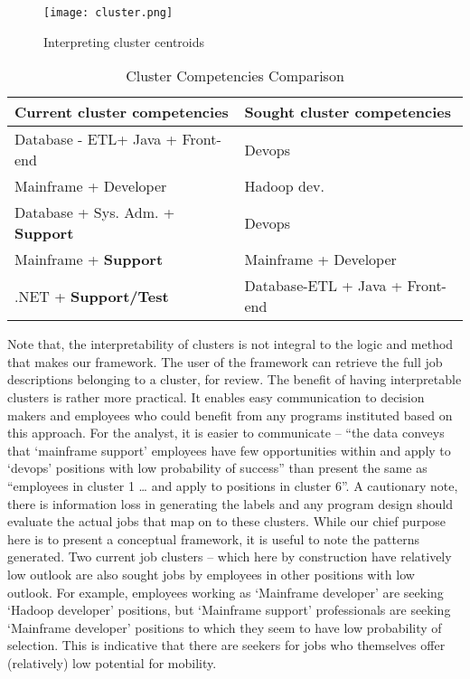 \documentclass{article}
\begin{document}
\begin{figure}[!ht]
    \centering
    \texttt{[image: cluster.png]} %
    \caption{Interpreting cluster centroids} %
    \label{fig:cluster} 
\end{figure}


\renewcommand{\arraystretch}{1.5} %

\begin{table}[ht]
\centering
\caption{Cluster Competencies Comparison}
\label{tab:cluster-competencies}
\begin{tabular}{>{\raggedright\arraybackslash}p{7cm}>{\raggedright\arraybackslash}p{7cm}}
\toprule
\textbf{Current cluster competencies} & \textbf{Sought cluster competencies} \\
\midrule
Database - ETL+ Java + Front-end & Devops \\
Mainframe + Developer & Hadoop dev. \\
Database + Sys. Adm. + \textbf{Support} & Devops \\
Mainframe + \textbf{Support} & Mainframe + Developer \\
.NET + \textbf{Support/Test} & Database-ETL + Java + Front-end \\
\bottomrule
\end{tabular}
\end{table}


Note that, the interpretability of clusters is not integral to the logic and method that makes our framework. The user of the framework can retrieve the full job descriptions belonging to a cluster, for review. The benefit of having interpretable clusters is rather more practical. It enables easy communication to decision makers and employees who could benefit from any programs instituted based on this approach. For the analyst, it is easier to communicate – “the data conveys that `mainframe support’ employees have few opportunities within and apply to `devops’ positions with low probability of success” than present the same as “employees in cluster 1 … and apply to positions in cluster 6”. A cautionary note, there is information loss in generating the labels and any program design should evaluate the actual jobs that map on to these clusters. While our chief purpose here is to present a conceptual framework, it is useful to note the patterns generated. Two current job clusters – which here by construction have relatively low outlook are also sought jobs by employees in other positions with low outlook. For example, employees working as `Mainframe developer’ are seeking `Hadoop developer’ positions, but `Mainframe support’ professionals are seeking ‘Mainframe developer’ positions to which they seem to have low probability of selection. This is indicative that there are seekers for jobs who themselves offer (relatively) low potential for mobility.
\end{document}
